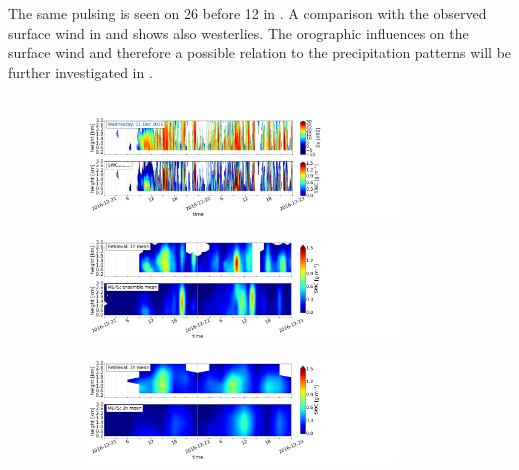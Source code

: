 The same pulsing is seen on \SI{26}{\dec} before \SI{12}{\UTC} in . A comparison with the observed surface wind in  and  shows also westerlies.  The orographic influences on the surface wind and therefore a possible relation to the precipitation patterns will be further investigated in . 
\\
\\
\begin{figure}[H]
	\centering
	\begin{subfigure}[t]{1.05\textwidth}
		\centering
		\includegraphics[trim={0.cm 2.2cm 19.cm 0.5cm},clip,width=0.9\textwidth]{./fig_obs_ret/20161221}
		\caption{}\label{fig:SWC:ret_21}
	\end{subfigure}
	\begin{subfigure}[t]{1.05\textwidth}
		\centering
		\includegraphics[trim={0.cm 2.2cm 19.cm 0.5cm},clip,width=0.9\textwidth]{./fig_vert_SWC_EM/20161221}
		\caption{}\label{fig:SWC_EM:21}
	\end{subfigure}
	\begin{subfigure}[t]{1.05\textwidth}
		\centering
		\includegraphics[trim={0.cm 0.8cm 19.cm 0.5cm},clip,width=0.9\textwidth]{./fig_vert_SWC_3h/20161221}

\end{subfigure}
\end{figure}
